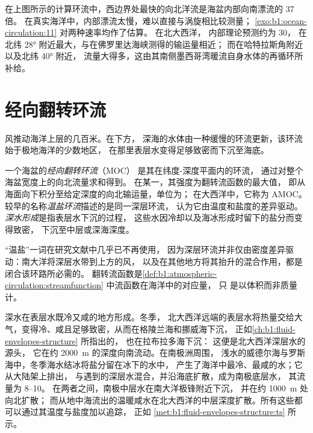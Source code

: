在上图所示的计算环流中，西边界处最快的向北洋流是海盆内部向南漂流的 37 倍。
在真实海洋中，内部漂流太慢，难以直接与涡旋相比较测量；
\cref{exo:b1:ocean-circulation:11} 对两种速率均作了估算。
在北大西洋，
内部理论预测约为 \qty{30}{\sverdrup}，
在北纬 \ang{28} 附近最大，与在佛罗里达海峡测得的输运量相近；
而在哈特拉斯角附近以及北纬 \ang{40} 附近，
流量大得多，这由其南侧墨西哥湾暖流自身水体的再循环所补给。

\section{经向翻转环流}\label{sec:b1:ocean-circulation:moc}

风推动海洋上层的几百米。在下方，
深海的水体由一种缓慢的环流更新，该环流始于极地海洋的少数地区，
在那里表层水变得足够致密而下沉至海底。

\begin{definition}\label{def:b1:ocean-circulation:moc}
一个海盆的\emph{经向翻转环流}（MOC）
是其在纬度-深度平面内的环流，
通过对整个海盆宽度上的向北流量求和得到。
在某一，其强度为翻转流函数的最大值，
即从海面向下积分至给定深度的向北输运量，单位为；
在大西洋中，它称为 AMOC。
较早的名称\emph{温盐环流}描述的是同一深层环流，
认为它由温度和盐度的差异驱动。
\emph{深水形成}是指表层水下沉的过程，
这些水因冷却以及海冰形成时留下的盐分而变得致密，
下沉至中层或深海深度。
\end{definition}

“温盐”一词在研究文献中几乎已不再使用，
因为深层环流并非仅由密度差异驱动：南大洋将深层水带到上方的风，
以及在其他地方将其抬升的混合作用，都是闭合该环路所必需的。
翻转流函数是\cref{def:b1:atmospheric-circulation:streamfunction} 中流函数在海洋中的对应量，
只
是以体积而非质量计。

深水在表层水既冷又咸的地方形成。冬季，
北大西洋远端的表层水将热量交给大气，变得冷、咸且足够致密，从而在格陵兰海和挪威海下沉，
正如\cref{ch:b1:fluid-envelopes-structure} 所指出的，
也在拉布拉多海下沉：
这便是北大西洋深层水的源头，
它在约 \qty{2000}{m} 的深度向南流动。在南极洲周围，
浅水的威德尔海与罗斯海中，冬季海水结冰将盐分留在冰下的水中，
产生了海洋中最冷、最咸的水；它从大陆架上排出，
与遇到的深层水混合，并沿海底扩散，成为南极底层水，
其流量为 \qtyrange{8}{10}{\sverdrup}。
在两者之间，南极中层水在南大洋极锋附近下沉，
并在约 \qty{1000}{m} 处向北扩散；
而从地中海流出的温暖咸水在北大西洋的中层深度扩散。所有这些都可以通过其温度与盐度加以追踪，
正如
\cref{met:b1:fluid-envelopes-structure:ts} 所示。

